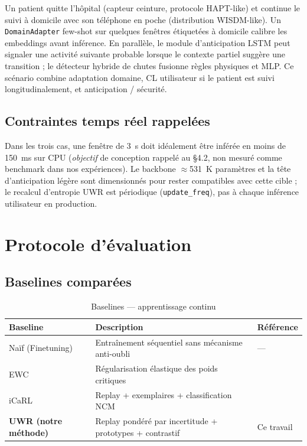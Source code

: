Un patient quitte l'hôpital (capteur ceinture, protocole HAPT-like) et continue
le suivi à domicile avec son téléphone en poche (distribution WISDM-like). Un
\texttt{DomainAdapter} few-shot sur quelques fenêtres étiquetées à domicile
calibre les embeddings avant inférence. En parallèle, le module d'anticipation LSTM peut signaler
une activité suivante probable lorsque le contexte partiel suggère une
transition ; le détecteur hybride de chutes fusionne règles physiques et MLP.
Ce scénario combine adaptation domaine, CL utilisateur si le patient est suivi
longitudinalement, et anticipation / sécurité.

\subsection{Contraintes temps réel rappelées}

Dans les trois cas, une fenêtre de 3~s doit idéalement être inférée en moins de
150~ms sur CPU (\emph{objectif} de conception rappelé au §4.2, non mesuré comme
benchmark dans nos expériences). Le backbone $\approx$531~K paramètres et la
tête d'anticipation légère sont dimensionnés pour rester compatibles avec cette
cible ; le recalcul d'entropie UWR est périodique (\texttt{update\_freq}), pas à chaque inférence utilisateur en production.

\section{Protocole d'évaluation}

\subsection{Baselines comparées}

\begin{table}[H]
\centering
\small
\begin{tabularx}{\textwidth}{|Y|Y|Y|}
\hline
\textbf{Baseline} & \textbf{Description} & \textbf{Référence} \\
\hline
Naïf (Finetuning) & Entraînement séquentiel sans mécanisme anti-oubli & — \\
EWC & Régularisation élastique des poids critiques & \parencite{kirkpatrick2017} \\
iCaRL & Replay + exemplaires + classification NCM & \parencite{rebuffi2017} \\
\textbf{UWR (notre méthode)} & Replay pondéré par incertitude + prototypes + contrastif & Ce travail \\
\hline
\end{tabularx}
\caption{Baselines — apprentissage continu}
\label{tab:baselines_cl}
\end{table}

